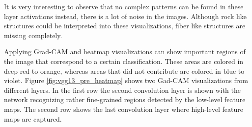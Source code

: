 \begin{figure}[H]
\label{fig:vgg13_fromscratch_filters}
\end{figure}

It is very interesting to observe that no complex patterns can be found in these layer activations instead, there is a lot of noise in the images. Although rock like structures could be interpreted into these visualizations, fiber like structures are missing completely.

Applying Grad-CAM and heatmap visualizations can show important regions of the image that correspond to a certain classification. These areas are colored in deep red to orange, whereas areas that did not contribute are colored in blue to violet. Figure \ref{fig:vgg13_pre_heatmap} shows two Gad-CAM visualizations from different layers. In the first row the second convolution layer is shown with the network recognizing rather fine-grained regions detected by the low-level feature maps. The second row shows the last convolution layer where high-level feature maps are captured.

